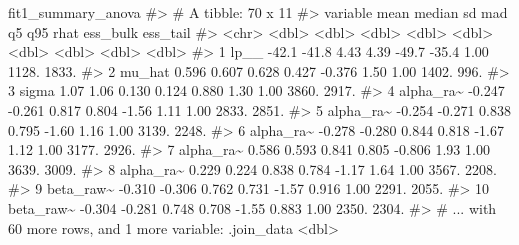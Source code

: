 \documentclass[
  11pt,
  letterpaper,
  DIV=11,
  numbers=noendperiod]{scrartcl}
\newenvironment{Shaded}{}{}
\newcommand{\CommentTok}[1]{\textcolor[rgb]{0.42,0.45,0.49}{#1}}
\newcommand{\NormalTok}[1]{\textcolor[rgb]{0.14,0.16,0.18}{#1}}
\begin{document}
\begin{Shaded}
\begin{Highlighting}[]

\NormalTok{fit1\_summary\_anova}
\CommentTok{\#\textgreater{} \# A tibble: 70 x 11}
\CommentTok{\#\textgreater{}    variable     mean  median    sd   mad      q5     q95  rhat ess\_bulk ess\_tail}
\CommentTok{\#\textgreater{}    \textless{}chr\textgreater{}       \textless{}dbl\textgreater{}   \textless{}dbl\textgreater{} \textless{}dbl\textgreater{} \textless{}dbl\textgreater{}   \textless{}dbl\textgreater{}   \textless{}dbl\textgreater{} \textless{}dbl\textgreater{}    \textless{}dbl\textgreater{}    \textless{}dbl\textgreater{}}
\CommentTok{\#\textgreater{}  1 lp\_\_      {-}42.1   {-}41.8   4.43  4.39  {-}49.7   {-}35.4    1.00    1128.    1833.}
\CommentTok{\#\textgreater{}  2 mu\_hat      0.596   0.607 0.628 0.427  {-}0.376   1.50   1.00    1402.     996.}
\CommentTok{\#\textgreater{}  3 sigma       1.07    1.06  0.130 0.124   0.880   1.30   1.00    3860.    2917.}
\CommentTok{\#\textgreater{}  4 alpha\_ra\textasciitilde{}  {-}0.247  {-}0.261 0.817 0.804  {-}1.56    1.11   1.00    2833.    2851.}
\CommentTok{\#\textgreater{}  5 alpha\_ra\textasciitilde{}  {-}0.254  {-}0.271 0.838 0.795  {-}1.60    1.16   1.00    3139.    2248.}
\CommentTok{\#\textgreater{}  6 alpha\_ra\textasciitilde{}  {-}0.278  {-}0.280 0.844 0.818  {-}1.67    1.12   1.00    3177.    2926.}
\CommentTok{\#\textgreater{}  7 alpha\_ra\textasciitilde{}   0.586   0.593 0.841 0.805  {-}0.806   1.93   1.00    3639.    3009.}
\CommentTok{\#\textgreater{}  8 alpha\_ra\textasciitilde{}   0.229   0.224 0.838 0.784  {-}1.17    1.64   1.00    3567.    2208.}
\CommentTok{\#\textgreater{}  9 beta\_raw\textasciitilde{}  {-}0.310  {-}0.306 0.762 0.731  {-}1.57    0.916  1.00    2291.    2055.}
\CommentTok{\#\textgreater{} 10 beta\_raw\textasciitilde{}  {-}0.304  {-}0.281 0.748 0.708  {-}1.55    0.883  1.00    2350.    2304.}
\CommentTok{\#\textgreater{} \# ... with 60 more rows, and 1 more variable: .join\_data \textless{}dbl\textgreater{}}


\end{Highlighting}
\end{Shaded}
\end{document}
